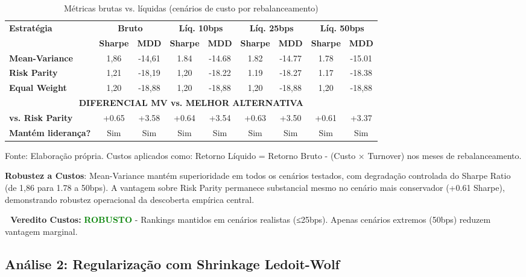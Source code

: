 \begin{table}[H]
\centering
\caption{Métricas brutas vs. líquidas (cenários de custo por rebalanceamento)}
\label{tab:bruto_liquido}
\begin{tabular}{|l|c|c|c|c|c|c|c|c|}
\hline
\multirow{2}{*}{\textbf{Estratégia}} & \multicolumn{2}{c|}{\textbf{Bruto}} & \multicolumn{2}{c|}{\textbf{Líq. 10bps}} & \multicolumn{2}{c|}{\textbf{Líq. 25bps}} & \multicolumn{2}{c|}{\textbf{Líq. 50bps}} \\
\cline{2-9}
 & \textbf{Sharpe} & \textbf{MDD} & \textbf{Sharpe} & \textbf{MDD} & \textbf{Sharpe} & \textbf{MDD} & \textbf{Sharpe} & \textbf{MDD} \\
\hline
\textbf{Mean-Variance} & 1,86 & -14,61 & 1.84 & -14.68 & 1.82 & -14.77 & 1.78 & -15.01 \\
\textbf{Risk Parity} & 1,21 & -18,19 & 1,20 & -18.22 & 1.19 & -18.27 & 1.17 & -18.38 \\
\textbf{Equal Weight} & 1,20 & -18,88 & 1,20 & -18,88 & 1,20 & -18,88 & 1,20 & -18,88 \\
\hline
\multicolumn{9}{|c|}{\textbf{DIFERENCIAL MV vs. MELHOR ALTERNATIVA}} \\
\hline
\textbf{vs. Risk Parity} & +0.65 & +3.58 & +0.64 & +3.54 & +0.63 & +3.50 & +0.61 & +3.37 \\
\textbf{Mantém liderança?} & Sim & Sim & Sim & Sim & Sim & Sim & Sim & Sim \\
\hline
\end{tabular}
\footnotesize
Fonte: Elaboração própria. Custos aplicados como: Retorno Líquido = Retorno Bruto - (Custo × Turnover) nos meses de rebalanceamento.
\end{table}

\textbf{Robustez a Custos}: Mean-Variance mantém superioridade em todos os cenários testados, com degradação controlada do Sharpe Ratio (de 1,86 para 1.78 a 50bps). A vantagem sobre Risk Parity permanece substancial mesmo no cenário mais conservador (+0.61 Sharpe), demonstrando robustez operacional da descoberta empírica central.

\textbf{🔹 Veredito Custos:} \textcolor{green}{\textbf{ROBUSTO}} - Rankings mantidos em cenários realistas (≤25bps). Apenas cenários extremos (50bps) reduzem vantagem marginal.

\subsection{Análise 2: Regularização com Shrinkage Ledoit-Wolf}

